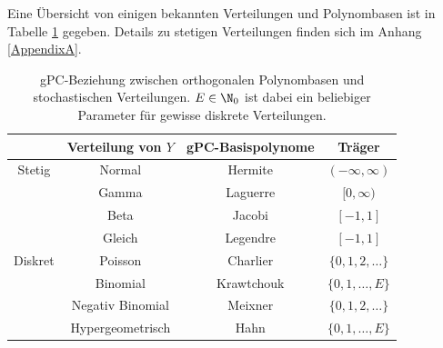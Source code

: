 Eine Übersicht von einigen bekannten Verteilungen und Polynombasen ist in Tabelle \ref{table:chaos} gegeben. Details zu stetigen Verteilungen finden sich im Anhang \ref{AppendixA}.\\
\begin{table}
\centering
\begin{tabular}{c|ccc}
 & Verteilung von $Y$ & gPC-Basispolynome & Träger \\ 
\hline 
Stetig & Normal & Hermite & $(-\infty,\infty)$ \\ 
 & Gamma & Laguerre & $[0,\infty)$ \\ 
 & Beta & Jacobi & $[-1,1]$ \\
 & Gleich & Legendre & $[-1,1]$ \\  
\hline 
Diskret & Poisson & Charlier & $\lbrace 0,1,2,\dots\rbrace$ \\ 
 & Binomial & Krawtchouk & $\lbrace 0,1,\dots,E\rbrace$ \\ 
 & Negativ Binomial & Meixner & $\lbrace 0,1,2,\dots\rbrace$ \\  
 & Hypergeometrisch & Hahn & $\lbrace 0,1,\dots,E\rbrace$
\end{tabular}
\caption{gPC-Beziehung zwischen orthogonalen Polynombasen und stochastischen Verteilungen. $E\in\N_0$ ist dabei ein beliebiger Parameter für gewisse diskrete Verteilungen.}
\label{table:chaos}
\end{table}

